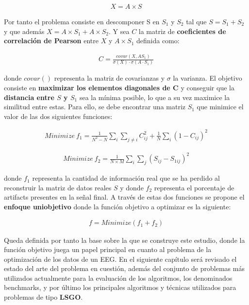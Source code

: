   \begin{equation}
	 \begin{gathered}
	 	X = A\times S
	 \end{gathered}
 \end{equation}
 
 Por tanto el problema consiste en descomponer S en $S_1$ y $S_2$ tal que $S = S_1 +S_2$ y que además $X = A\times S_1 + A\times S_2$. Y sea $C$ la matriz de \textbf{coeficientes de correlación de Pearson} entre $X$ y $A\times S_1$ definida como:
 
 \begin{equation} \label{eq:covar}
	 \begin{gathered}
	 	C = \frac{covar(X,AS_1)}{\sigma(X)\cdot \sigma (A\cdot S_1)}
	 \end{gathered}
 \end{equation}
 
 donde $covar( )$ representa la matriz de covarianzas y $\sigma$ la varianza.
 El objetivo consiste en \textbf{maximizar los elementos diagonales de C} y conseguir que la \textbf{distancia entre $S$ y $S_1$} sea la mínima posible, lo que a su vez maximice la similitud entre estas. Para ello, se debe encontrar una matriz $S_1$ que minimice el valor de las dos siguientes funciones:
 
  \begin{equation} \label{eq:function1}
	 \begin{gathered}
	 	Minimize \ f_1 = \frac{1}{N^2 -N} \sum_{i}^{} \sum_{j \neq i}^{} C_{ij}^2 + \frac{1}{N} \sum_{i}^{} (1-C_{ij})^2
	 \end{gathered}
 \end{equation}
 
  \begin{equation} \label{eq:function2}
	 \begin{gathered}
	 	Minimize \ f_2 = \frac{1}{N \times M} \sum_{i}^{} \sum_{j}^{} (S_{ij} - S_{1ij})^2
	 \end{gathered}
 \end{equation}
 
 donde $f_1$ representa la cantidad de información real que se ha perdido al reconstruir la matriz de datos reales $S$ y donde $f_2$ representa el porcentaje de artifacts presentes en la señal final. A través de estas dos funciones se propone el  \textbf{enfoque uniobjetivo} donde la función objetivo a optimizar es la siguiente:
 
 \begin{equation} \label{eq:FObj}
	 \begin{gathered}
	 	f = Minimize(f_1 + f_2)
	 \end{gathered}
 \end{equation}
 
 Queda definida por tanto la base sobre la que se construye este estudio, donde la función objetivo juega un papel principal en cuanto al problema de la optimización de los datos de un EEG. En el siguiente capítulo será revisado el estado del arte del problema en cuestión, además del conjunto de problemas más utilizados actualmente para la evaluación de los algoritmos, los denominados benchmarks, y por último los principales algoritmos y técnicas utilizados para problemas de tipo \textbf{LSGO}.